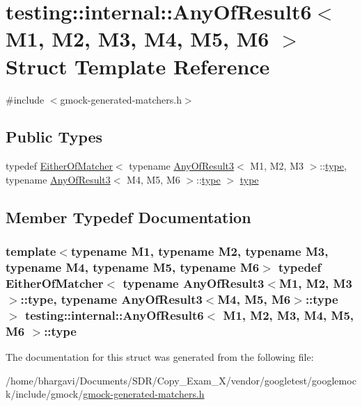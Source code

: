 \hypertarget{structtesting_1_1internal_1_1_any_of_result6}{}\section{testing\+:\+:internal\+:\+:Any\+Of\+Result6$<$ M1, M2, M3, M4, M5, M6 $>$ Struct Template Reference}
\label{structtesting_1_1internal_1_1_any_of_result6}


{\ttfamily \#include $<$gmock-\/generated-\/matchers.\+h$>$}

\subsection*{Public Types}
\begin{DoxyCompactItemize}
\item 
typedef \hyperlink{classtesting_1_1internal_1_1_either_of_matcher}{Either\+Of\+Matcher}$<$ typename \hyperlink{structtesting_1_1internal_1_1_any_of_result3}{Any\+Of\+Result3}$<$ M1, M2, M3 $>$\+::\hyperlink{structtesting_1_1internal_1_1_any_of_result6_a15837eb05d9ac5a76c20d344a4988dd1}{type}, typename \hyperlink{structtesting_1_1internal_1_1_any_of_result3}{Any\+Of\+Result3}$<$ M4, M5, M6 $>$\+::\hyperlink{structtesting_1_1internal_1_1_any_of_result6_a15837eb05d9ac5a76c20d344a4988dd1}{type} $>$ \hyperlink{structtesting_1_1internal_1_1_any_of_result6_a15837eb05d9ac5a76c20d344a4988dd1}{type}
\end{DoxyCompactItemize}


\subsection{Member Typedef Documentation}
\subsubsection[{\texorpdfstring{type}{type}}]{\setlength{\rightskip}{0pt plus 5cm}template$<$typename M1, typename M2, typename M3, typename M4, typename M5, typename M6$>$ typedef {\bf Either\+Of\+Matcher}$<$ typename {\bf Any\+Of\+Result3}$<$M1, M2, M3$>$\+::{\bf type}, typename {\bf Any\+Of\+Result3}$<$M4, M5, M6$>$\+::{\bf type} $>$ {\bf testing\+::internal\+::\+Any\+Of\+Result6}$<$ M1, M2, M3, M4, M5, M6 $>$\+::{\bf type}}\hypertarget{structtesting_1_1internal_1_1_any_of_result6_a15837eb05d9ac5a76c20d344a4988dd1}{}\label{structtesting_1_1internal_1_1_any_of_result6_a15837eb05d9ac5a76c20d344a4988dd1}


The documentation for this struct was generated from the following file\+:\begin{DoxyCompactItemize}
\item 
/home/bhargavi/\+Documents/\+S\+D\+R/\+Copy\+\_\+\+Exam\+\_\+X/vendor/googletest/googlemock/include/gmock/\hyperlink{gmock-generated-matchers_8h}{gmock-\/generated-\/matchers.\+h}\end{DoxyCompactItemize}
